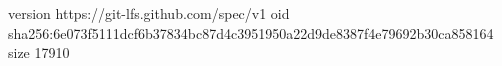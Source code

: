 version https://git-lfs.github.com/spec/v1
oid sha256:6e073f5111dcf6b37834bc87d4c3951950a22d9de8387f4e79692b30ca858164
size 17910
